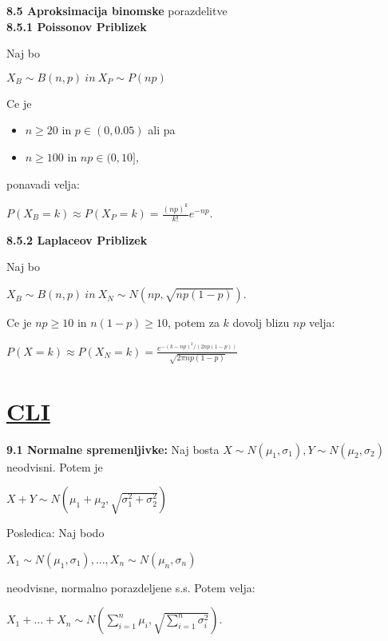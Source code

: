 \documentclass{article}
\begin{document}
\begin{multicols}{2}
\textbf{8.5 Aproksimacija binomske} porazdelitve\\

\textbf{8.5.1 Poissonov Priblizek}

Naj bo 
\begin{center}
    \begin{math}
        X_B \sim B(n, p)\: in\: X_P \sim P(np)
    \end{math}
\end{center}
Ce je 
\begin{itemize}
    \item $n \geq 20$ in $p \in (0, 0.05)$ ali pa
    \item $n \geq 100$ in $np \in (0, 10]$,
\end{itemize}
ponavadi velja:
\begin{center}
    \begin{math}
        P(X_B = k) \approx P(X_P = k) = \frac{(np)^k}{k!} e^{-np} 
    \end{math}.
\end{center}

\textbf{8.5.2 Laplaceov Priblizek}

Naj bo 
\begin{center}
    \begin{math}
        X_B \sim B(n, p)\: in\: X_N \sim N(np, \sqrt{np(1-p)})
    \end{math}.
\end{center}
Ce je $np \geq 10$ in $n(1 - p) \geq 10$, potem za $k$ dovolj blizu $np$ velja:
\begin{center}
    \begin{math}
        P(X = k) \approx P(X_N = k) = 
        \frac{
            e^{-(k - np)^2/ (2np(1 - p))}
        }{\sqrt{2 \pi np(1 - p)}}
    \end{math}
\end{center}

\section{\underline{CLI}}

\textbf{9.1 Normalne spremenljivke:} Naj bosta $X \sim N(\mu_1, \sigma_1), Y \sim N(\mu_2, \sigma_2)$ neodvisni.
Potem je 
\begin{center}
    \begin{math}
        X + Y \sim N(\mu_1 + \mu_2, \sqrt{\sigma_1^2 + \sigma_2^2})    
    \end{math}
\end{center}
Posledica: Naj bodo
\begin{center}
    \begin{math}
        X_1 \sim N(\mu_1, \sigma_1), \dots , X_n \sim  N(\mu_n, \sigma_n)
    \end{math}
\end{center}
neodvisne, normalno porazdeljene s.s. Potem velja:
\begin{center}
    \begin{math}
        X_1 + \dots + X_n \sim N (
            \sum_{i=1}^{n} \mu_i, \sqrt{\sum_{i=1}^{n} \sigma_i^2}
        )
    \end{math}.
\end{center}


\end{multicols}
\end{document}
